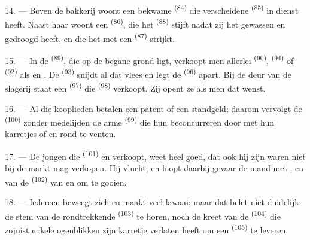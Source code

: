 14. --- Boven de bakkerij woont een bekwame  \textsuperscript{(84)} die
verscheidene  \textsuperscript{(85)} in dienst heeft. Naast haar woont
een
 \textsuperscript{(86)}, die het 
\textsuperscript{(88)} stijft nadat zij het gewassen en gedroogd heeft, en die het met een
 \textsuperscript{(87)} strijkt.

\VUsaut{4.0mm}
\VUsaut{3.0mm}

15. --- In de  \textsuperscript{(89)}, die op de begane grond ligt, verkoopt
men allerlei  \textsuperscript{(90)}, 
\textsuperscript{(94)} of
 \textsuperscript{(92)} als  en . De  \textsuperscript{(93)} snijdt al
dat vlees en legt de  \textsuperscript{(96)} apart. Bij de deur van de
slagerij staat een
 \textsuperscript{(97)} die 
\textsuperscript{(98)} verkoopt. Zij opent ze als men dat wenst.

16. --- Al die kooplieden betalen een patent of een standgeld; daarom vervolgt de
 \textsuperscript{(100)} zonder medelijden de arme
 \textsuperscript{(99)} die hun beconcurreren door
met hun karretjes  of
 en
 rond te venten.

\VUsaut{4.0mm}
\VUsaut{3.0mm}

17. --- De jongen die  \textsuperscript{(101)} en  verkoopt,
weet heel goed, dat ook hij zijn waren niet bij de markt mag verkopen. Hij vlucht, en loopt
daarbij gevaar de mand met ,
 en  van de 
\textsuperscript{(102)} van  en  om te gooien.

18. --- Iedereen beweegt zich en maakt veel lawaai; maar dat belet niet duidelijk de stem van
de rondtrekkende  \textsuperscript{(103)} te horen, noch de kreet van de
 \textsuperscript{(104)} die zojuist enkele ogenblikken zijn karretje
verlaten heeft om een  \textsuperscript{(105)} te leveren.
\VUsaut{6.0mm}
\VUfilet{22mm}
